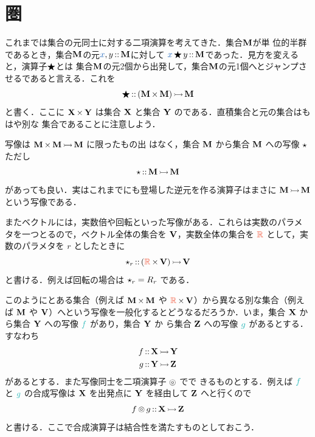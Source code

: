 \documentclass[a5paper,twoside,fleqn,draft]{jsbook}
\begin{document}
\section{圏}

これまでは集合の元同士に対する二項演算を考えてきた．集合$\mathbf{M}$が単
位的半群であるとき，集合$\mathbf{M}$の元$\hVar{x},y\mIn\mSet{M}$に対して
$\hVar{x}\hAnyBinOp y\mIn\mSet{M}$であった．見方を変えると，演算子$\operatorname{\bigstar}$とは
集合$\mathbf{M}$の元2個から出発して，集合$\mathbf{M}$の元1個へとジャンプさ
せるであると言える．これを
\begin{equation}
\operatorname{\bigstar}\operatorname{{:\!:}}{}(\mathbf{M}\operatorname{\bf{\times}}\mathbf{M})\operatorname{\rightarrowtail}\mathbf{M}
\end{equation}
と書く．ここに $\mathbf{X}\operatorname{\bf{\times}}\mathbf{Y}$ は集合 $\mathbf{X}$ と集合
$\mathbf{Y}$ のである．直積集合と元の集合はもはや別な
集合であることに注意しよう．

写像は $\mathbf{M}\operatorname{\bf{\times}}\mathbf{M}\operatorname{\rightarrowtail}\mathbf{M}$ に限ったもの出
はなく，集合 $\mathbf{M}$ から集合 $\mathbf{M}$ への写像 $\operatorname{\star}$ ただし
\begin{equation}
\operatorname{\star}\operatorname{{:\!:}}\mathbf{M}\operatorname{\rightarrowtail}\mathbf{M}
\end{equation}
があっても良い．実はこれまでにも登場した逆元を作る演算子はまさに
$\mathbf{M}\operatorname{\rightarrowtail}\mathbf{M}$ という写像である．

またベクトルには，実数倍や回転といった写像がある．これらは実数のパラメ
タを一つとるので，ベクトル全体の集合を $\mathbf{V}$，実数全体の集合を
$\mRSet$ として，実数のパラメタを $r$ としたときに
\begin{equation}
\mUnOp_r\mIn{}\mMorph{(\mRSet\mSetTimes\mSet{V})}{\mSet{V}}
\end{equation}
と書ける．例えば回転の場合は $\operatorname{\star}_r=R_r$ である．

このようにとある集合（例えば $\mathbf{M}\operatorname{\bf{\times}}\mathbf{M}$ や
$\mRSet\mSetTimes\mSet{V}$）から異なる別な集合（例えば $\mathbf{M}$ や
$\mathbf{V}$）へという写像を一般化するとどうなるだろうか．いま，集合
$\mathbf{X}$ から集合 $\mathbf{Y}$ への写像 $\hFunc{f}$ があり，集合 $\mathbf{Y}$ か
ら集合 $\mathbf{Z}$ への写像 $\hFunc{g}$ があるとする．すなわち
\begin{align}
f&\operatorname{{:\!:}}\mathbf{X}\operatorname{\rightarrowtail}\mathbf{Y}\\
g&\operatorname{{:\!:}}\mathbf{Y}\operatorname{\rightarrowtail}\mathbf{Z}
\end{align}
があるとする．また写像同士を二項演算子 $\operatorname{\circledcirc}$ でで
きるものとする．例えば $\hFunc{f}$ と $\hFunc{g}$ の合成写像は $\mathbf{X}$ を出発点に
$\mathbf{Y}$ を経由して $\mathbf{Z}$ へと行くので
\begin{equation}
f\operatorname{\circledcirc} g\operatorname{{:\!:}}\mathbf{X}\operatorname{\rightarrowtail}\mathbf{Z}
\end{equation}
と書ける．ここで合成演算子は結合性を満たすものとしておこう．
\end{document}
